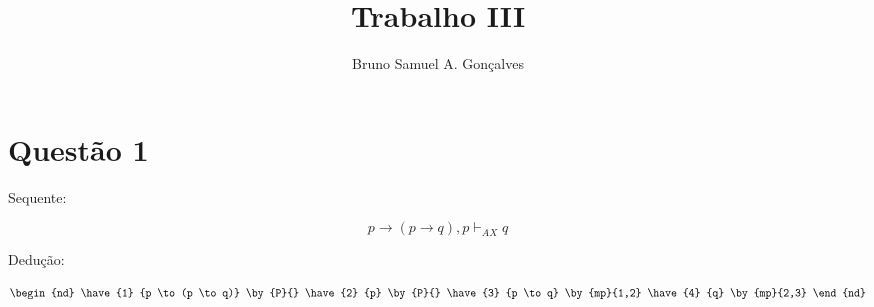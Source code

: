 \documentclass[12pt]{article}
\title{Trabalho III}
\author{Bruno Samuel A. Gonçalves}
\date{}
\begin{document}
\maketitle
\thispagestyle{empty}

\section{Questão 1}

\noindent Sequente:

\[ p \to (p \to q), p \vdash_{AX} q \]

\noindent Dedução:

\[
\begin{nd}
  \have {1} {p \to (p \to q)}   \by{P}{}
  \have {2} {p}                 \by{P}{}
  \have {3} {p \to q}           \by{mp}{1,2}
  \have {4} {q}                 \by{mp}{2,3}
\end{nd}
\]
\end{document}
